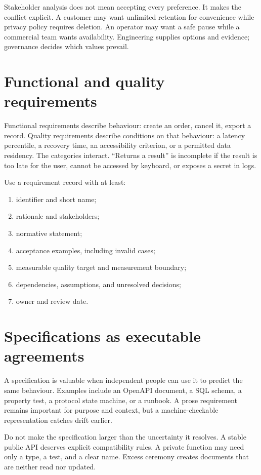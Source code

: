 Stakeholder analysis does not mean accepting every preference. It makes the
conflict explicit. A customer may want unlimited retention for convenience while
privacy policy requires deletion. An operator may want a safe pause while a
commercial team wants availability. Engineering supplies options and evidence;
governance decides which values prevail.

\section{Functional and quality requirements}
Functional requirements describe behaviour: create an order, cancel it, export a
record. Quality requirements describe conditions on that behaviour: a latency
percentile, a recovery time, an accessibility criterion, or a permitted data
residency. The categories interact. “Returns a result” is incomplete if the
result is too late for the user, cannot be accessed by keyboard, or exposes a
secret in logs.

Use a requirement record with at least:

\begin{enumerate}
  \item identifier and short name;
  \item rationale and stakeholders;
  \item normative statement;
  \item acceptance examples, including invalid cases;
  \item measurable quality target and measurement boundary;
  \item dependencies, assumptions, and unresolved decisions;
  \item owner and review date.
\end{enumerate}

\section{Specifications as executable agreements}
A specification is valuable when independent people can use it to predict the
same behaviour. Examples include an OpenAPI document, a SQL schema, a property
test, a protocol state machine, or a runbook. A prose requirement remains
important for purpose and context, but a machine-checkable representation catches
drift earlier.

Do not make the specification larger than the uncertainty it resolves. A stable
public API deserves explicit compatibility rules. A private function may need
only a type, a test, and a clear name. Excess ceremony creates documents that
are neither read nor updated.

